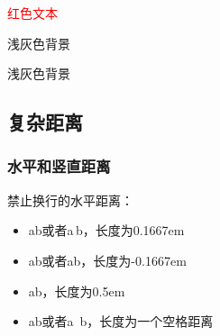 \documentclass[twoside]{ctexart}
\begin{document}
            \textcolor{red}{红色文本}

            \colorbox[gray]{.95}{浅灰色背景}



            {\setlength{\fboxrule}{1pt}
            \setlength{\fboxsep}{0pt}
            \colorbox[gray]{.95}{浅灰色背景}

            }

    \subsection{复杂距离}
        \subsubsection{水平和竖直距离}
            禁止换行的水平距离：
            \begin{itemize}
                \item a\thinspace b或者a\,b，长度为0.1667em
                \item a\negthinspace b或者a\!b，长度为-0.1667em
                \item a\enspace b，长度为0.5em
                \item a\nobreakspace b或者a~b，长度为一个空格距离
            \end{itemize}
\end{document}
